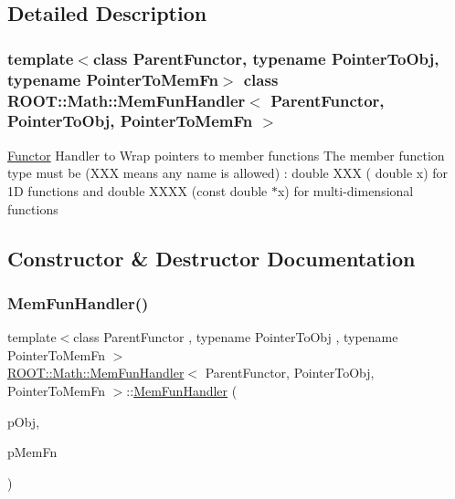 \subsection{Detailed Description}
\subsubsection*{template$<$class Parent\+Functor, typename Pointer\+To\+Obj, typename Pointer\+To\+Mem\+Fn$>$\newline
class R\+O\+O\+T\+::\+Math\+::\+Mem\+Fun\+Handler$<$ Parent\+Functor, Pointer\+To\+Obj, Pointer\+To\+Mem\+Fn $>$}

\mbox{\hyperlink{classROOT_1_1Math_1_1Functor}{Functor}} Handler to Wrap pointers to member functions The member function type must be (X\+XX means any name is allowed) \+: double X\+XX ( double x) for 1D functions and double X\+X\+XX (const double $\ast$x) for multi-\/dimensional functions 

\subsection{Constructor \& Destructor Documentation}
\mbox{\label{classROOT_1_1Math_1_1MemFunHandler_a714877219c36aab344b3785be06affcc}} 
\subsubsection{\texorpdfstring{MemFunHandler()}{MemFunHandler()}\hspace{0.1cm}{\footnotesize\ttfamily [1/4]}}
{\footnotesize\ttfamily template$<$class Parent\+Functor , typename Pointer\+To\+Obj , typename Pointer\+To\+Mem\+Fn $>$ \\
\mbox{\hyperlink{classROOT_1_1Math_1_1MemFunHandler}{R\+O\+O\+T\+::\+Math\+::\+Mem\+Fun\+Handler}}$<$ Parent\+Functor, Pointer\+To\+Obj, Pointer\+To\+Mem\+Fn $>$\+::\mbox{\hyperlink{classROOT_1_1Math_1_1MemFunHandler}{Mem\+Fun\+Handler}} (\begin{DoxyParamCaption}\item[{const Pointer\+To\+Obj \&}]{p\+Obj,  }\item[{Pointer\+To\+Mem\+Fn}]{p\+Mem\+Fn }\end{DoxyParamCaption})\hspace{0.3cm}{\ttfamily [inline]}}



